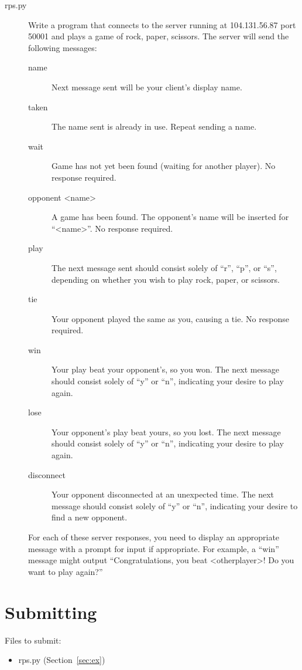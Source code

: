 \documentclass[11pt]{cselabheader}
\begin{document}
\begin{description}
\item[rps.py] Write a program that connects to the server running at
  104.131.56.87 port 50001 and plays a game of rock, paper, scissors. The server
  will send the following messages:

  \begin{description}
    \item[name] Next message sent will be your client's display name.
    \item[taken] The name sent is already in use. Repeat sending a name.
    \item[wait] Game has not yet been found (waiting for another player). No
      response required.
    \item[opponent <name>] A game has been found. The opponent's name will be
      inserted for ``<name>''. No response required.
    \item[play] The next message sent should consist solely of ``r'', ``p'', or
      ``s'', depending on whether you wish to play rock, paper, or scissors.
    \item[tie] Your opponent played the same as you, causing a tie. No response
      required.
    \item[win] Your play beat your opponent's, so you won. The next
      message should consist solely of ``y'' or ``n'', indicating your desire to
      play again.
    \item[lose] Your opponent's play beat yours, so you lost. The next message
      should consist solely of ``y'' or ``n'', indicating your desire to play
      again.  
    \item[disconnect] Your opponent disconnected at an unexpected time.  The
      next message should consist solely of ``y'' or ``n'', indicating your
      desire to find a new opponent.
  \end{description}

  For each of these server responses, you need to display an appropriate message
  with a prompt for input if appropriate. For example, a ``win'' message might
  output ``Congratulations, you beat <otherplayer>! Do you want to play again?''
\end{description}

\pagebreak
\section{Submitting}

Files to submit:
\begin{itemize}
  \item rps.py (Section~\ref{sec:ex})
\end{itemize}
\end{document}
